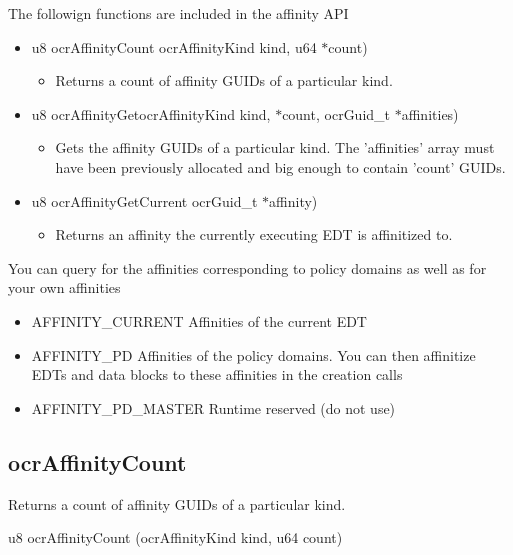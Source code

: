 The followign functions are included in the affinity API
\begin{itemize}
\item 
{u8} {ocr\-Affinity\-Count} {ocr\-Affinity\-Kind} kind, {u64} $\ast$count)
\begin{itemize}
\item Returns a count of affinity G\-U\-I\-Ds of a particular kind.
\end{itemize}

\item 
{u8} {ocr\-Affinity\-Get}{ocr\-Affinity\-Kind} kind, $\ast$count, {ocr\-Guid\-\_\-t} $\ast$affinities)
\begin{itemize}
\item Gets the affinity G\-U\-I\-Ds of a particular kind. The 'affinities' array must have been previously 
allocated and big enough to contain 'count' G\-U\-I\-Ds.
\end{itemize}

\item 
{u8} {ocr\-Affinity\-Get\-Current} {ocr\-Guid\-\_\-t} $\ast$affinity)
\begin{itemize}
\item Returns an affinity the currently executing E\-D\-T is affinitized to. 
\end{itemize}
\end{itemize}


You can query for the affinities corresponding to policy domains as well as for your own affinities 
\begin{itemize}
\item 
{A\-F\-F\-I\-N\-I\-T\-Y\-\_\-\-C\-U\-R\-R\-E\-N\-T} Affinities of the current E\-D\-T 
\item 
{A\-F\-F\-I\-N\-I\-T\-Y\-\_\-\-P\-D} 
Affinities of the policy domains. You can then affinitize E\-D\-Ts and data blocks to these affinities in the creation calls 

\item
{A\-F\-F\-I\-N\-I\-T\-Y\-\_\-\-P\-D\-\_\-\-M\-A\-S\-T\-E\-R}
Runtime reserved (do not use) 
\end{itemize}


\subsection{ocr\-Affinity\-Count}
\summary
Returns a count of affinity G\-U\-I\-Ds of a particular kind. 

\begin{boxedcode}
u8 ocrAffinityCount (ocrAffinityKind kind, u64 \*count)
\end{boxedcode}


